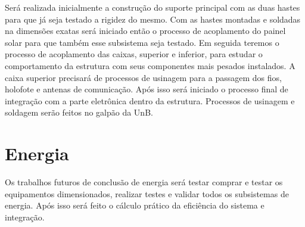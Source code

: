Será realizada inicialmente a construção do suporte principal com as duas hastes para que já seja testado a rigidez do mesmo. Com as hastes montadas e soldadas na dimensões exatas será iniciado então o processo de acoplamento do painel solar para que também esse subsistema seja testado. Em seguida teremos o processo de acoplamento das caixas, superior e inferior, para estudar o comportamento da estrutura com seus componentes mais pesados instalados. A caixa superior precisará de processos de usinagem para a passagem dos fios, holofote e antenas de comunicação. Após isso será iniciado o processo final de integração com a parte eletrônica dentro da estrutura. Processos de usinagem e soldagem serão feitos no galpão da UnB.

\section{Energia}

Os trabalhos futuros de conclusão de energia será testar comprar e testar os equipamentos dimensionados, realizar testes e validar todos os subsistemas de energia. Após isso será feito o cálculo prático da eficiência do sistema e integração.
